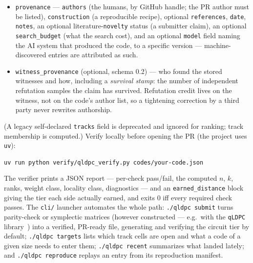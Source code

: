 \documentclass[11pt]{article}
\begin{document}
\begin{itemize}[nosep]
		\texttt{circuits/<slug>/} (\texttt{memory\_x.stim},
		\texttt{memory\_z.stim}, and their derived detector error models
		\texttt{.dem}) and claims a per-basis circuit-level distance
		\texttt{d\_circ} with a witness, a round count $\ge d$, and the pinned
		\texttt{stim} version. It may also carry \texttt{gates}, claimed
		transversal Clifford gates, and \texttt{ler}, a measured logical error
		rate (Section~\ref{sec:circuit}).
		\item \texttt{provenance} --- \texttt{authors} (the humans, by GitHub
		handle; the PR author must be listed), \texttt{construction} (a
		reproducible recipe), optional \texttt{references}, \texttt{date},
		\texttt{notes}, an optional literature-\texttt{novelty} status (a
		submitter claim), an optional \texttt{search\_budget} (what the
		search cost), and an optional \texttt{model} field naming the AI
		system that produced the code, to a specific version ---
		machine-discovered entries are attributed as such.
		\item \texttt{witness\_provenance} (optional, schema 0.2) --- who found
		the stored witnesses and how, including a \emph{survival stamp}: the
		number of independent refutation samples the claim has survived.
		Refutation credit lives on the witness, not on the code's author list,
		so a tightening correction by a third party never rewrites authorship.
	\end{itemize}
	(A legacy self-declared \texttt{tracks} field is deprecated and ignored
	for ranking; track membership is computed.) Verify locally before opening
	the PR (the project uses \texttt{uv}):
	\begin{center}
		\texttt{uv run python verify/qldpc\_verify.py codes/your-code.json}
	\end{center}
	The verifier prints a JSON report --- per-check pass/fail, the computed
	$n$, $k$, ranks, weight class, locality class, diagnostics --- and an
	\texttt{earned\_distance} block giving the tier each side actually
	earned, and exits $0$ iff every required check passes. The \texttt{cli/}
	launcher automates the whole path: \texttt{./qldpc submit} turns
	parity-check or symplectic matrices (however constructed --- e.g.\ with
	the \texttt{qLDPC} library~\cite{perlin2023qldpc}) into a verified,
	PR-ready file, generating and verifying the circuit tier by default;
	\texttt{./qldpc targets} lists which track cells are open and what a
	code of a given size needs to enter them; \texttt{./qldpc recent}
	summarizes what landed lately; and \texttt{./qldpc reproduce} replays an
	entry from its reproduction manifest.
\end{document}
